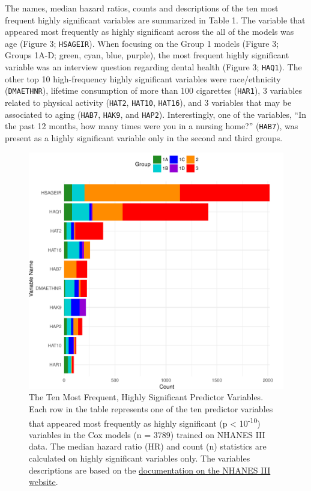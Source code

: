 \documentclass[12pt,oneside]{reedthesis}
\theoremstyle{definition}
\theoremstyle{definition}
\theoremstyle{definition}
\theoremstyle{remark}
\begin{document}
The names, median hazard ratios, counts and descriptions of the ten most
frequent highly significant variables are summarized in Table 1. The
variable that appeared most frequently as highly significant across the
all of the models was age (Figure 3; \texttt{HSAGEIR}). When focusing on
the Group 1 models (Figure 3; Groups 1A-D; green, cyan, blue, purple),
the most frequent highly significant variable was an interview question
regarding dental health (Figure 3; \texttt{HAQ1}). The other top 10
high-frequency highly significant variables were race/ethnicity
(\texttt{DMAETHNR}), lifetime consumption of more than 100 cigarettes
(\texttt{HAR1}), 3 variables related to physical activity
(\texttt{HAT2}, \texttt{HAT10}, \texttt{HAT16}), and 3 variables that
may be associated to aging (\texttt{HAB7}, \texttt{HAK9}, and
\texttt{HAP2}). Interestingly, one of the variables, ``In the past 12
months, how many times were you in a nursing home?'' (\texttt{HAB7}),
was present as a highly significant variable only in the second and
third groups.
\begin{figure}
\centering
\includegraphics[width=\textwidth,height=0.6\textheight]{figure/3-varbar-final.pdf}
\caption{The Ten Most Frequent, Highly Significant Predictor Variables.
Each row in the table represents one of the ten predictor variables that
appeared most frequently as highly significant (p \textless{}
10\textsuperscript{-10}) variables in the Cox models (n = 3789) trained
on NHANES III data. The median hazard ratio (HR) and count (n)
statistics are calculated on highly significant variables only. The
variables descriptions are based on the
\href{https://wwwn.cdc.gov/nchs/nhanes/nhanes3/DataFiles.aspx}{documentation
on the NHANES III website}.}
\end{figure}
\end{document}
